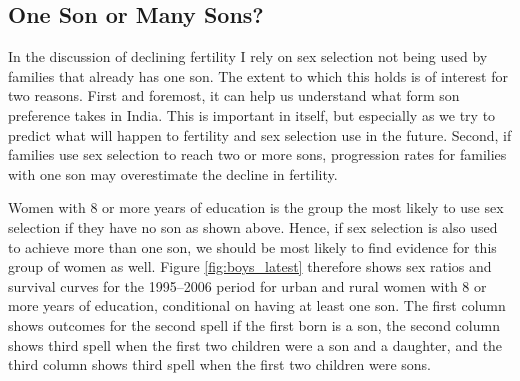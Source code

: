 \documentclass[12pt,letterpaper]{article}
\begin{document}
\subsection{One Son or Many Sons?}

In the discussion of declining fertility I rely on sex selection not being used by 
families that already has one son.
The extent to which this holds is of interest for two reasons.
First and foremost, it can help us understand what form son preference takes in India.
This is important in itself, but especially as we try to predict what will happen to 
fertility and sex selection use in the future.
Second,
if families use sex selection to reach two or more sons, progression rates for families 
with one son may overestimate the decline in fertility.

Women with 8 or more years of education is the group the most likely to use sex 
selection if they have no son as shown above.
Hence, if sex selection is also used to achieve more than one son, we should be
most likely to find evidence for this group of women as well.
Figure \ref{fig:boys_latest} therefore shows sex ratios and survival curves for 
the 1995--2006 period for urban and rural women with 8 or more years of education, 
conditional on having at least one son.
The first column shows outcomes for the second spell if the first born is a son,
the second column shows third spell when the first two children were a son and 
a daughter, and the third column shows third spell when the first two children were sons.
\end{document}
